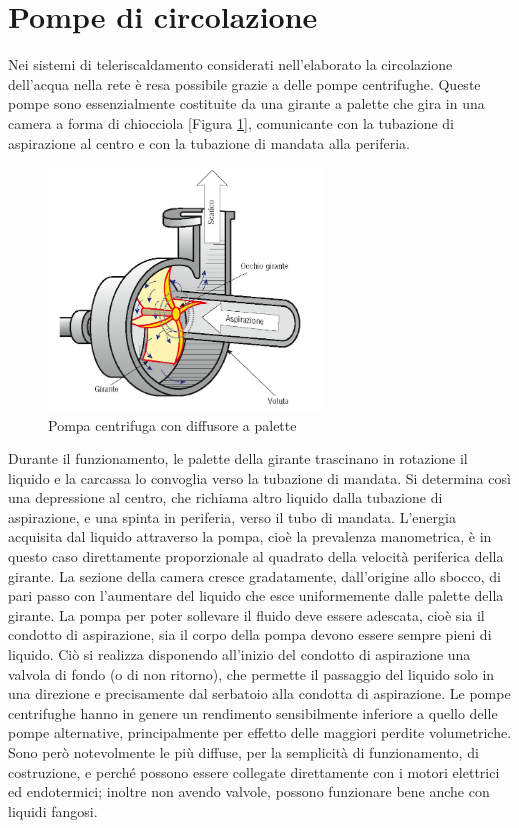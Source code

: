 \documentclass[laurea,oneside,11pt]{USiena_tesiLM}
\begin{document}
\section{Pompe di circolazione}
Nei sistemi di teleriscaldamento considerati nell'elaborato la circolazione dell'acqua nella rete è resa possibile grazie a delle pompe centrifughe. Queste pompe sono essenzialmente costituite da una girante a palette che gira in una camera a forma di chiocciola [Figura \ref{fig:pompa_centrifuga}], comunicante con la tubazione di aspirazione al centro e con la tubazione di mandata alla periferia.

\begin{figure}[h]
\centering
\includegraphics[width=0.65\textwidth]{figure/pompa_centrifuga} 
\caption{Pompa centrifuga con diffusore a palette}
\label{fig:pompa_centrifuga}
\end{figure}

Durante il funzionamento, le palette della girante trascinano in rotazione il liquido e la carcassa lo convoglia verso la tubazione di mandata.
Si determina così una depressione al centro, che richiama altro liquido dalla tubazione di aspirazione, e una spinta in periferia, verso il tubo di mandata.
L'energia acquisita dal liquido attraverso la pompa, cioè la prevalenza manometrica, è in questo caso direttamente proporzionale al quadrato della velocità periferica della girante.
La sezione della camera cresce gradatamente, dall'origine allo sbocco, di pari passo con l'aumentare del liquido che esce uniformemente dalle palette della girante.
La pompa per poter sollevare il fluido deve
essere adescata, cioè sia il condotto di
aspirazione, sia il corpo della pompa devono essere sempre pieni di liquido. Ciò si realizza disponendo all'inizio del condotto di aspirazione una valvola di fondo (o di non ritorno), che permette il passaggio del liquido solo in una direzione e precisamente dal serbatoio alla condotta di aspirazione.
Le pompe centrifughe hanno in genere un rendimento sensibilmente inferiore a quello delle pompe alternative, principalmente per effetto delle maggiori perdite volumetriche. Sono però notevolmente le più diffuse, per la semplicità di funzionamento, di costruzione, e perché possono essere collegate direttamente con i motori elettrici ed endotermici; inoltre non avendo valvole, possono funzionare bene anche con liquidi fangosi.
\end{document}
